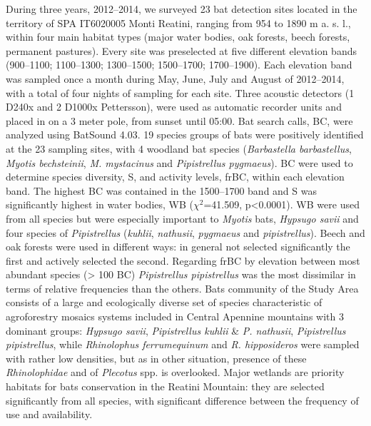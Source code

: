 { During three years, 2012--2014, we surveyed 23 bat detection sites located in the territory of SPA IT6020005 Monti Reatini, ranging from 954 to 1890 m a. s. l., within  four main  habitat types (major water bodies, oak forests, beech forests, permanent pastures). Every site was preselected at five different elevation bands (900--1100; 1100--1300; 1300--1500; 1500--1700; 1700--1900). Each elevation band was sampled once a month  during  May, June, July and August of 2012--2014, with a total of four nights of sampling for each site. Three acoustic detectors (1 D240x and 2 D1000x Pettersson), were used as automatic recorder units and placed in on a 3 meter pole, from sunset until 05:00. Bat search calls, \textsf{BC}, were analyzed using BatSound 4.03. 19 species groups of bats were positively identified at the 23 sampling sites, with 4 woodland bat species  (\emph{Barbastella barbastellus}, \emph{Myotis bechsteinii}, \emph{M. mystacinus} and \emph{Pipistrellus pygmaeus}). \textsf{BC} were used to determine species diversity, \textsf{S},  and activity levels, \textsf{frBC}, within each elevation band. The highest \textsf{BC} was contained in the 1500--1700 band and \textsf{S} was significantly highest in water bodies, \textsf{WB} ($\chi^2$=41.509, p<0.0001). \textsf{WB} were used from all species but were especially important to \emph{Myotis}  bats, \emph{Hypsugo savii} and four species of  \emph{Pipistrellus} (\emph{kuhlii}, \emph{nathusii}, \emph{pygmaeus} and \emph{pipistrellus}). Beech and oak forests were used in different ways: in general not selected significantly the first and actively selected the second. Regarding \textsf{frBC} by elevation between most abundant species (> 100 \textsf{BC})  \emph{Pipistrellus pipistrellus} was the most dissimilar in terms of relative frequencies than the others. Bats community of the Study Area consists of a large and ecologically diverse set of species characteristic of agroforestry mosaics systems included in Central Apennine mountains with 3 dominant groups: \emph{Hypsugo savii},  \emph{Pipistrellus kuhlii} \& \emph{P. nathusii}, \emph{Pipistrellus pipistrellus}, while \emph{Rhinolophus  ferrumequinum} and \emph{R. hipposideros} were sampled with rather low densities, but as in other situation, presence of these \emph{Rhinolophidae} and of \emph{Plecotus} spp. is overlooked. Major wetlands are priority habitats for bats conservation in the Reatini Mountain: they are selected significantly from all species, with significant difference between the frequency of use and availability.} %